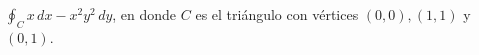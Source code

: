 \item $\oint_C x \, dx - x^2y^2 \, dy$, en donde $C$ es el triángulo con vértices $(0, 0), (1, 1)$ y $(0, 1)$.
